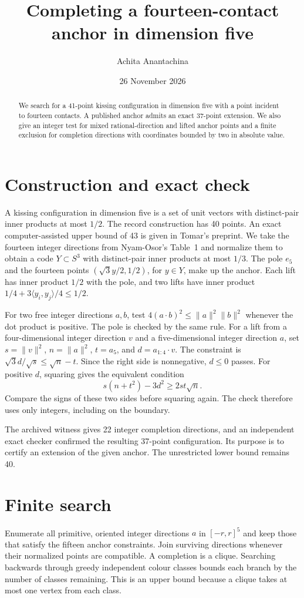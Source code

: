 \documentclass[10pt]{article}
\title{Completing a fourteen-contact anchor in dimension five}
\author{Achita Anantachina}
\date{26 November 2026}
\begin{document}
\maketitle
\begin{abstract}
We search for a 41-point kissing configuration in dimension five with
a point incident to fourteen contacts. A published anchor admits an
exact 37-point extension. We also give an integer test for mixed
rational-direction and lifted anchor points and a finite exclusion for
completion directions with coordinates bounded by two in absolute value.
\end{abstract}

\section{Construction and exact check}
A kissing configuration in dimension five is a set of unit vectors with
distinct-pair inner products at most \(1/2\). The record construction has
40 points. An exact computer-assisted upper bound of 43 is given in
Tomar's preprint. We take the fourteen integer directions from
Nyam-Osor's Table~1 and normalize them to obtain a code \(Y\subset S^3\) with
distinct-pair inner products at most \(1/3\). The pole \(e_5\) and the fourteen
points \((\sqrt{3}y/2,1/2)\), for \(y\in Y\), make up the anchor. Each
lift has inner product \(1/2\) with the pole, and two lifts have inner
product \(1/4+3\langle y_i,y_j\rangle/4\le 1/2\).

For two free integer directions \(a,b\), test \(4(a\cdot b)^2\le
\|a\|^2\|b\|^2\) whenever the dot product is positive. The pole is checked
by the same rule. For a lift from a four-dimensional integer direction
\(v\) and a five-dimensional integer direction \(a\), set \(s=\|v\|^2\),
\(n=\|a\|^2\), \(t=a_5\), and \(d=a_{1:4}\cdot v\). The constraint is
\(\sqrt{3}d/\sqrt{s}\le\sqrt n-t\). Since the right side is
nonnegative, \(d\le 0\) passes. For positive \(d\), squaring gives the
equivalent condition
\[
s(n+t^2)-3d^2 \ge 2st\sqrt n.
\]
Compare the signs of these two sides before squaring again. The check
therefore uses only integers, including on the boundary.

The archived witness gives 22 integer completion directions, and an
independent exact checker confirmed the resulting 37-point configuration.
Its purpose is to certify an extension of the given anchor. The
unrestricted lower bound remains 40.

\section{Finite search}
Enumerate all primitive, oriented integer directions \(a\) in
\([-r,r]^5\) and keep those that satisfy the fifteen anchor constraints.
Join surviving directions whenever their normalized points are
compatible. A completion is a clique. Searching backwards through
greedy independent colour classes bounds each branch by the number of
classes remaining. This is an upper bound because a clique takes at most
one vertex from each class.
\end{document}
